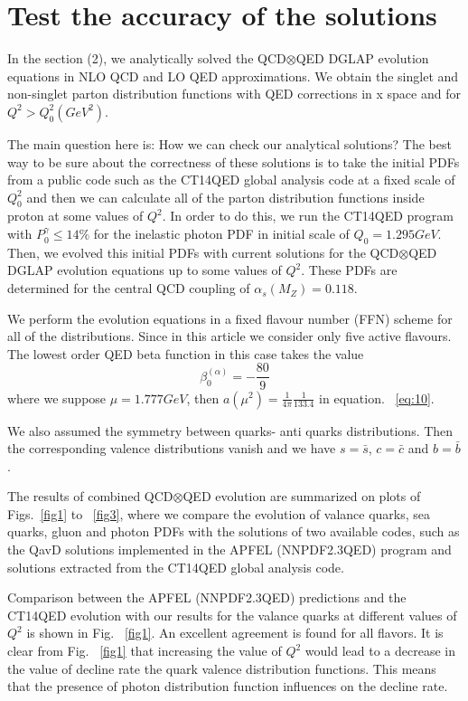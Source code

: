 \documentclass[review]{elsarticle}
\begin{document}
\section{Test the accuracy of the solutions}

In the section (2), we analytically solved the QCD$\otimes$QED DGLAP evolution equations in NLO QCD and LO QED approximations. We obtain the singlet and non-singlet parton distribution functions with QED corrections in x space and for $Q^{2}>Q_{0}^{2} (GeV^{2})$.

The main question here is: How we can check our analytical solutions? The best way to be sure about the correctness of these solutions is to take the initial PDFs from  a public code such as the CT14QED global analysis code \cite{Schmidt:2015zda}
at a fixed scale of $Q_{0}^2$  and then we can calculate all of the parton distribution functions inside proton at some values of $Q^{2}$.  In order to do this, we run the CT14QED program \cite{Schmidt:2015zda} with  $P_0^ {\gamma } \leq 14   \% $ for the inelastic photon PDF in initial scale of $Q_0= 1.295 GeV$.  Then, we evolved this initial PDFs with current solutions for the QCD$\otimes$QED DGLAP evolution equations up to some values of $Q^{2}$. These PDFs are determined for the central QCD coupling of $\alpha_s(M_Z) = 0.118$.

We perform the evolution equations in a fixed flavour number (FFN) scheme for all of the distributions.  Since in this article we consider only five active flavours. The lowest order QED beta function in this case takes the value
\begin{equation}
\beta_{0}^{(\alpha)}=-\frac{80}{9}
\end{equation}
where we suppose $\mu=1.777GeV$, then $a(\mu^{2})=\frac{1}{4\pi}\frac{1}{133.4}$  in equation. ~\eqref{eq:10}.

We also assumed the symmetry between quarks- anti quarks distributions. Then the corresponding valence distributions vanish and we have $s= \bar s$, $c= \bar c$ and $b= \bar b$.

The results of combined QCD$\otimes$QED evolution are summarized on plots of Figs.~\eqref{fig1} to ~\eqref{fig3}, where we compare the evolution of valance quarks, sea quarks, gluon and photon PDFs with the solutions of two available codes, such as the QavD solutions implemented in the APFEL (NNPDF2.3QED) \cite{Bertone:2013vaa} program and solutions extracted from the CT14QED global analysis code.

Comparison between the APFEL (NNPDF2.3QED) predictions and the CT14QED evolution with our results for the valance quarks at different values of $Q^{2}$ is shown in Fig. ~\eqref{fig1}. An excellent agreement is found for all flavors. It is clear from Fig. ~\eqref{fig1} that  increasing  the value of $Q^{2}$ would lead to a decrease in the value of decline rate the quark valence distribution functions. This means that the presence of photon distribution function influences on the decline rate.
\end{document}
